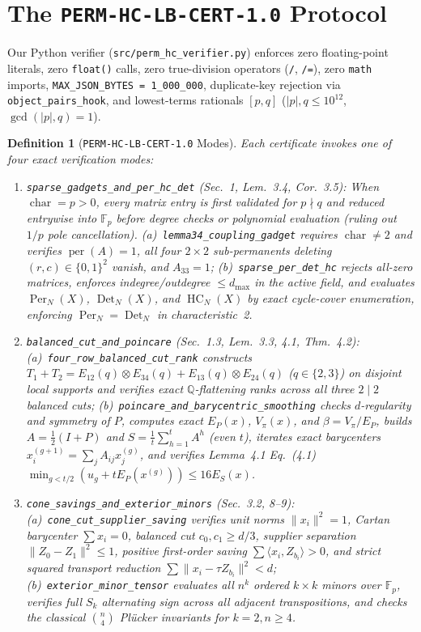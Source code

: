 \documentclass[10pt,twocolumn]{article}
\newtheorem{definition}{Definition}
\begin{document}
\section{The \texttt{PERM-HC-LB-CERT-1.0} Protocol}
{\raggedright
Our Python verifier (\texttt{src/perm\_hc\_verifier.py}) enforces zero floating-point literals, zero \texttt{float()} calls, zero true-division operators (\texttt{/}, \texttt{/=}), zero \texttt{math} imports, \texttt{MAX\_JSON\_BYTES = 1\_000\_000}, duplicate-key rejection via \texttt{object\_pairs\_hook}, and lowest-terms rationals $[p,q]$ ($|p|,q \le 10^{12}$, $\gcd(|p|,q)=1$).

\begin{definition}[\texttt{PERM-HC-LB-CERT-1.0} Modes]
Each certificate invokes one of four exact verification modes:
\begin{enumerate}[leftmargin=*,itemsep=1.5pt,topsep=2pt]
\item \texttt{sparse\_gadgets\_and\_\allowbreak per\_hc\_det} (Sec.~1, Lem.~3.4, Cor.~3.5): When $\operatorname{char}=p>0$, every matrix entry is first validated for $p \nmid q$ and reduced entrywise into $\mathbb{F}_p$ before degree checks or polynomial evaluation (ruling out $1/p$ pole cancellation). (a)~\texttt{lemma34\_coupling\_gadget} requires $\operatorname{char}\ne 2$ and verifies $\operatorname{per}(A)=1$, all four $2\times 2$ sub-permanents deleting $(r,c)\in\{0,1\}^2$ vanish, and $A_{33}=1$; (b)~\texttt{sparse\_per\_det\_hc} rejects all-zero matrices, enforces indegree/outdegree $\le d_{\max}$ in the active field, and evaluates $\operatorname{Per}_N(X)$, $\operatorname{Det}_N(X)$, and $\operatorname{HC}_N(X)$ by exact cycle-cover enumeration, enforcing $\operatorname{Per}_N = \operatorname{Det}_N$ in characteristic~2.
\item \texttt{balanced\_cut\_and\_\allowbreak poincare} (Sec.~1.3, Lem.~3.3, 4.1, Thm.~4.2): (a)~\texttt{four\_row\_balanced\_cut\_rank} constructs $T_1+T_2 = E_{12}(q)\otimes E_{34}(q) + E_{13}(q)\otimes E_{24}(q)$ ($q\in\{2,3\}$) on disjoint local supports and verifies exact $\mathbb{Q}$-flattening ranks across all three $2\mid 2$ balanced cuts; (b)~\texttt{poincare\_and\_barycentric\_smoothing} checks $d$-regularity and symmetry of $P$, computes exact $E_P(x)$, $V_\pi(x)$, and $\beta=V_\pi/E_P$, builds $A=\frac{1}{2}(I+P)$ and $S=\frac{1}{t}\sum_{h=1}^t A^h$ (even $t$), iterates exact barycenters $x^{(g+1)}_i=\sum_j A_{ij}x^{(g)}_j$, and verifies Lemma~4.1 Eq.~(4.1) $\min_{g<t/2}(u_g + t E_P(x^{(g)})) \le 16 E_S(x)$.
\item \texttt{cone\_savings\_and\_\allowbreak exterior\_minors} (Sec.~3.2, 8--9): (a)~\texttt{cone\_cut\_supplier\_saving} verifies unit norms $\|x_i\|^2=1$, Cartan barycenter $\sum x_i = 0$, balanced cut $c_0,c_1 \ge d/3$, supplier separation $\|Z_0-Z_1\|^2\le 1$, positive first-order saving $\sum \langle x_i, Z_{b_i}\rangle > 0$, and strict squared transport reduction $\sum \|x_i - \tau Z_{b_i}\|^2 < d$; (b)~\texttt{exterior\_minor\_tensor} evaluates all $n^k$ ordered $k\times k$ minors over $\mathbb{F}_p$, verifies full $S_k$ alternating sign across all adjacent transpositions, and checks the classical $\binom{n}{4}$ Pl\"ucker invariants for $k=2, n\ge 4$.

\end{enumerate}
\end{definition}}
\end{document}
